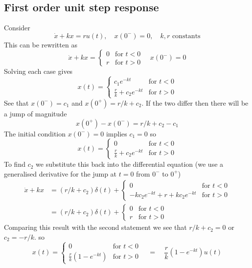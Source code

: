 \documentclass{report}
\begin{document}
\subsection{First order unit step response}
Consider
\begin{equation*}
\dot{x}+kx=ru(t),\quad x(0^-)=0,\quad k,r\text{ constants}
\end{equation*}
This can be rewritten as
\begin{equation*}
\dot{x}+kx=\begin{cases}0&\text{for }t<0\\
r&\text{for }t>0\end{cases}
\quad x(0^-)=0
\end{equation*}
Solving each case gives
\begin{equation*}
x(t)=\begin{cases}c_1e^{-kt}&\text{for }t<0\\
\frac{r}{k}+c_2e^{-kt}&\text{for }t>0\end{cases}
\end{equation*}
See that $x(0^-)=c_1$ and $x(0^+)=r/k+c_2$. If the two differ then there will be a jump of magnitude
\begin{equation*}
x(0^+)-x(0^-)=r/k+c_2-c_1
\end{equation*}
The initial condition $x(0^-)=0$ implies $c_1=0$ so
\begin{equation*}
x(t)=\begin{cases}0&\text{for }t<0\\
\frac{r}{k}+c_2e^{-kt}&\text{for }t>0\end{cases}
\end{equation*}
To find $c_2$ we substitute this back into the differential equation (we use a generalised derivative
for the jump at $t=0$ from $0^-$ to $0^+$)
\begin{align*}
\dot{x}+kx&=(r/k+c_2)\delta(t)+\begin{cases}
0&\text{for }t<0\\
-kc_2e^{-kt}+r+kc_2e^{-kt}&\text{for }t>0
\end{cases}\\
&=(r/k+c_2)\delta(t)+\begin{cases}
0&\text{for }t<0\\
r&\text{for }t>0\end{cases}
\end{align*}
Comparing this result with the second statement we see that
$r/k+c_2=0$ or $c_2=-r/k$.
so
\begin{equation*}
x(t)=\begin{cases}0&\text{for }t<0\\
\frac{r}{k}(1-e^{-kt})&\text{for }t>0\end{cases}
\quad=\quad\frac{r}{k}(1-e^{-kt})u(t)
\end{equation*}
\end{document}
